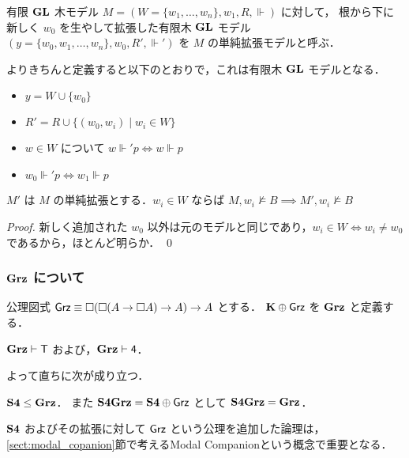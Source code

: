 \documentclass{jsarticle}
\begin{document}
\begin{definition}
	有限 $\mathbf{GL}$ 木モデル $M = (W = \{w_1,\dots,w_n\}, w_1, R, \Vdash)$ に対して，
	根から下に新しく $w_0$ を生やして拡張した有限木 $\mathbf{GL}$ モデル $(y = \{w_0,w_1,\dots,w_n\}, w_0, R', \Vdash')$ を $M$ の単純拡張モデルと呼ぶ．

	よりきちんと定義すると以下のとおりで，これは有限木 $\mathbf{GL}$ モデルとなる．
	\begin{itemize}
		\item $y = W \cup \{w_0\}$
		\item $R' = R \cup \{(w_0,w_i) \mid w_i \in W\}$
		\item $w \in W$ について $w \Vdash' p \iff w \Vdash p$
		\item $w_0 \Vdash' p \iff w_1 \Vdash p$
	\end{itemize}
\end{definition}

\begin{lemma}\label{lem:simple_extension}
	$M'$ は $M$ の単純拡張とする．$w_i \in W$ ならば $M,w_i \nvDash B \implies M',w_i \nvDash B$
\end{lemma}
\begin{proof}
	新しく追加された $w_0$ 以外は元のモデルと同じであり，$w_i \in W \iff w_i \neq w_0$ であるから，ほとんど明らか．
	\qed
\end{proof}

\subsubsection{$\LogicGrz$ について}

\begin{definition}
	公理図式 $\mathsf{Grz} \equiv \Box(\Box(A \to \Box A) \to A) \to A$ \index{$\AxGrz$} とする．
	$\mathbf{K} \oplus \mathsf{Grz}$ を $\LogicGrz$ と定義する．\index{$\LogicGrz$}
\end{definition}

\begin{lemma}
	$\mathbf{Grz} \vdash \mathsf{T}$ および，$\mathbf{Grz} \vdash \mathsf{4}$．
\end{lemma}

よって直ちに次が成り立つ．

\begin{corollary}\label{cor:S4_weakerThan_Grz}
	$\mathbf{S4} \leq \mathbf{Grz}$．
	また $\mathbf{S4Grz} = \mathbf{S4} \oplus \mathsf{Grz}$ として $\mathbf{S4Grz} = \mathbf{Grz}$．
\end{corollary}

\begin{remark}
	$\mathbf{S4}$ およびその拡張に対して $\AxGrz$ という公理を追加した論理は，
	\ref{sect:modal_copanion}節で考えるModal Companionという概念で重要となる．
\end{remark}
\end{document}
